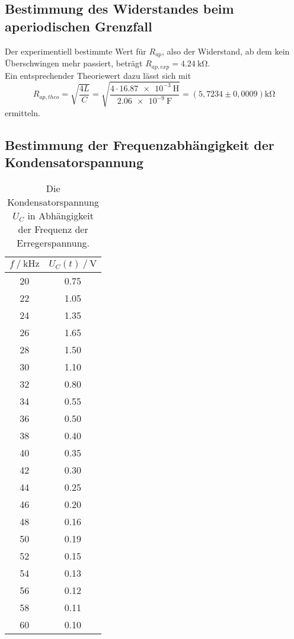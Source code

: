 \subsection{Bestimmung des Widerstandes beim aperiodischen Grenzfall}
\label{R_ap}

Der experimentiell bestimmte Wert für $R_{ap}$, also der Widerstand, ab dem kein Überschwingen mehr passiert, beträgt $R_{ap,exp} = \SI{4,24}{\kilo\ohm}$. \\
Ein entsprechender Theoriewert dazu lässt sich mit 
\begin{equation*}
  R_{ap,theo} = \sqrt{\frac{4L}{C}} = \sqrt{\frac{4 \cdot \SI{16,87e-3}{\henry}}{\SI{2,06e-9}{\farad}}} = (5,7234\pm 0,0009)\unit{\kilo\ohm}
\end{equation*}
ermitteln.






\subsection{Bestimmung der Frequenzabhängigkeit der Kondensatorspannung}
\label{Kondensatorspannung}

\begin{table}[H]
  \centering
  \caption{Die Kondensatorspannung $U_C$ in Abhängigkeit der Frequenz der Erregerspannung.}
  \begin{tabular}{cc}
    \toprule
    {$f \mathbin{/} \unit{\kilo\hertz}$} &
    {$U_C(t) \mathbin{/} \unit{\volt}$} \\
    \midrule
    20 & 0.75 \\
    22 & 1.05 \\
    24 & 1.35 \\
    26 & 1.65 \\
    28 & 1.50 \\
    30 & 1.10 \\
    32 & 0.80 \\
    34 & 0.55 \\
    36 & 0.50 \\
    38 & 0.40 \\
    40 & 0.35 \\
    42 & 0.30 \\
    44 & 0.25 \\
    46 & 0.20 \\
    48 & 0.16 \\
    50 & 0.19 \\
    52 & 0.15 \\
    54 & 0.13 \\
    56 & 0.12 \\
    58 & 0.11 \\
    60 & 0.10 \\

    \bottomrule
  \end{tabular}
  \label{tab:Tabelle1}
\end{table}


